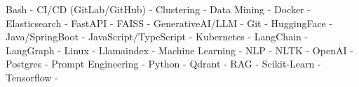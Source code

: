 \small{
Bash -
CI/CD (GitLab/GitHub) -
Clustering -
Data Mining -
Docker -
Elasticsearch -
FastAPI -
FAISS -
GenerativeAI/LLM -
Git -
HuggingFace -
Java/SpringBoot -
JavaScript/TypeScript -
Kubernetes -
LangChain -
LangGraph -
Linux -
Llamaindex -
Machine Learning -
NLP -
NLTK -
OpenAI -
Postgres -
Prompt Engineering -
Python -
Qdrant -
RAG -
Scikit-Learn -
Tensorflow -
}